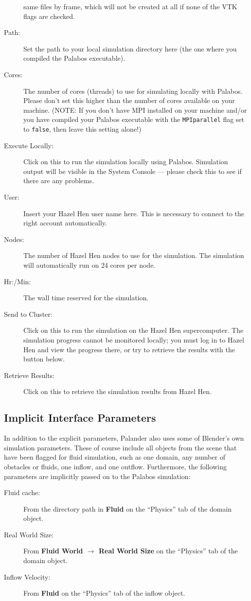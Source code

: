 \documentclass[12pt]{article}
\begin{document}
\begin{description}
same files by frame, which will not be created at all if none of the VTK flags are checked.
\item[Path:] Set the path to your local simulation directory here (the one where you compiled the Palabos 
executable).
\item[Cores:] The number of cores (threads) to use for simulating locally with Palabos. Please don't set this 
higher than the number of cores available on your machine. (NOTE: If you don't have MPI installed on your 
machine and/or you have compiled your Palabos executable with the \verb|MPIparallel| flag set to 
\verb|false|, then leave this setting alone!)
\item[Execute Locally:] Click on this to run the simulation locally using Palabos. Simulation output will be 
visible in the System Console --- please check this to see if there are any problems.
\item[User:] Insert your Hazel Hen user name here. This is necessary to connect to the right account 
automatically.
\item[Nodes:] The number of Hazel Hen nodes to use for the simulation. The simulation will automatically run 
on 24 cores per node.
\item[Hr:/Min:] The wall time reserved for the simulation.
\item[Send to Cluster:] Click on this to run the simulation on the Hazel Hen supercomputer. The simulation 
progress cannot be monitored locally; you must log in to Hazel Hen and view the progress there, or try to 
retrieve the results with the button below.
\item[Retrieve Results:] Click on this to retrieve the simulation results from Hazel Hen.
\end{description}

\subsection{Implicit Interface Parameters}

In addition to the explicit parameters, Palander also uses some of Blender's own simulation parameters. These 
of course include all objects from the scene that have been flagged for fluid simulation, such as one domain, 
any number of obstacles or fluids, one inflow, and one outflow. Furthermore, the following parameters are 
implicitly passed on to the Palabos simulation:
\begin{description}
\item[Fluid cache:] From the directory path in {\bf Fluid} on the ``Physics'' tab of the domain object.
\item[Real World Size:] From {\bf Fluid World $\to$ Real World Size} on the ``Physics'' tab of the domain 
object.
\item[Inflow Velocity:] From {\bf Fluid} on the ``Physics'' tab of the inflow object.
\end{description}
\end{document}
